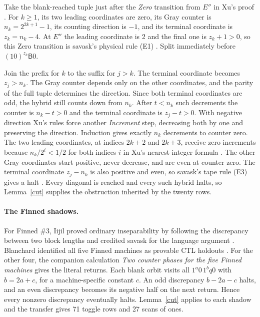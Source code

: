 \documentclass[11pt]{article}
\newcommand{\state}[1]{\mathsf{#1}}
\begin{document}
Take the blank-reached tuple just after the \emph{Zero} transition from \(E''\) in Xu's proof \cite[\S4, p.~9]{xu}. For \(k\ge1\), its two leading coordinates are zero, its Gray counter is \(n_k=2^{2k+1}-1\), its counting direction is \(-1\), and its terminal coordinate is \(z_k=n_k-4\). At \(E''\) the leading coordinate is 2 and the final one is \(z_k+1>0\), so this Zero transition is savask's physical rule (E1) \cite[Remark~1.1]{xu}. Split immediately before \((10)^{z_k}\state B0\).

Join the prefix for \(k\) to the suffix for \(j>k\). The terminal coordinate becomes \(z_j>n_k\). The Gray counter depends only on the other coordinates, and the parity of the full tuple determines the direction. Since both terminal coordinates are odd, the hybrid still counts down from \(n_k\). After \(t<n_k\) such decrements the counter is \(n_k-t>0\) and the terminal coordinate is \(z_j-t>0\). With negative direction Xu's rules force another \emph{Increment} step, decreasing both by one and preserving the direction. Induction gives exactly \(n_k\) decrements to counter zero. The two leading coordinates, at indices \(2k+2\) and \(2k+3\), receive zero increments because \(n_k/2^i<1/2\) for both indices \(i\) in Xu's nearest-integer formula \cite[Prop.~2.2]{xu}. The other Gray coordinates start positive, never decrease, and are even at counter zero. The terminal coordinate \(z_j-n_k\) is also positive and even, so savask's tape rule (E3) gives a halt \cite[p.~3]{savask}. Every diagonal is reached and every such hybrid halts, so Lemma~\ref{cut} supplies the obstruction inherited by the twenty rows.

\paragraph{The Finned shadows.}
For Finned \#3, Iijil proved ordinary inseparability by following the discrepancy between two block lengths and credited savask for the language argument \cite{iijil}. Blanchard identified all five Finned machines as provable CTL holdouts \cite{finnedsummary}. For the other four, the companion calculation \emph{Two counter phases for the five Finned machines} gives the literal returns. Each blank orbit visits all \(1^a0\,1^bq0\) with \(b=2a+c\), for a machine-specific constant \(c\). An odd discrepancy \(b-2a-c\) halts, and an even discrepancy becomes its negative half on the next return. Hence every nonzero discrepancy eventually halts. Lemma~\ref{cut} applies to each shadow and the transfer gives 71 toggle rows and 27 scans of ones.
\end{document}
